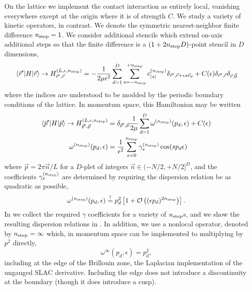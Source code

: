 On the lattice we implement the contact interaction as entirely local, vanishing everywhere except at the origin where it is of strength $C$.  We study a variety of kinetic operators, in contrast.  We denote the symmetric nearest-neighbor finite difference ${n_\text{step}}=1$.  We consider additional stencils which extend on-axis additional steps so that the finite difference is a $(1+2{n_\text{step}} D)$-point stencil in $D$ dimensions,
\begin{equation}
    \left\langle \vec{r}' \middle| H \middle| \vec{r} \right\rangle
    \rightarrow
    H_{\vec{r}',\vec{r}}^{(L,\epsilon,{n_\text{step}})}
    = - \frac{1}{2 \mu \epsilon^2} \sum_{d=1}^{D} \sum_{s=-{n_\text{step}}}^{+{n_\text{step}}} c^{({n_\text{step}})}_{|s|} \delta_{\vec{r}',\vec{r}+\epsilon s \vec{e}_d} + C(\epsilon) \delta_{\vec{r}',\vec{r}}\delta_{\vec{r},\vec{0}}
\end{equation}
where the indices are understood to be modded by the periodic boundary conditions of the lattice.
In momentum space, this Hamiltonian may be written
\begin{align}
    \label{eq:p space hamiltonian}
    \left\langle \vec{p}' \middle| H \middle| \vec{p} \right\rangle
    \rightarrow
    H_{\vec{p}',\vec{p}}^{(L,\epsilon,{n_\text{step}})}
    &= \delta_{\vec{p}',\vec{p}} \frac{1}{2\mu} \sum_{d=1}^{D} \omega^{({n_\text{step}})}(p_d,\epsilon) + C(\epsilon)
    \\
    \label{eq:gamma definition}
    \omega^{({n_\text{step}})}(p_d,\epsilon)
    &= \frac{1}{\epsilon^2} \sum_{s=0}^{{n_\text{step}}} \gamma_{s}^{({n_\text{step}})} \cos(s p_d \epsilon)
\end{align}
where $\vec{p} = 2\pi \vec{n}/L$ for a $D$-plet of integers $\vec{n} \in (-N/2, +N/2]^D$, and the coefficients $\gamma_{s}^{({n_\text{step}})}$ are determined by requiring the dispersion relation be as quadratic as possible,
\begin{equation}
    \label{eq:gamma determination}
    \omega^{({n_\text{step}})}(p_d,\epsilon) \overset{!}{=} p_d^2 \left[ 1 + \mathcal{O}\left((\epsilon p_d)^{2{n_\text{step}}}\right)\right].
\end{equation}
In  we collect the required $\gamma$ coefficients for a variety of ${n_\text{step}}$s, and we show the resulting dispersion relations in .
In addition, we use a nonlocal operator, denoted by ${n_\text{step}}=\infty$ which, in momentum space can be implemented to multiplying by $p^2$ directly,
\begin{equation}
    \omega^{\infty}(p_d,\epsilon) = p_d^2,
\end{equation}
including at the edge of the Brillouin zone, the Laplacian implementation of the ungauged SLAC derivative.
Including the edge does not introduce a discontinuity at the boundary (though it does introduce a cusp).

